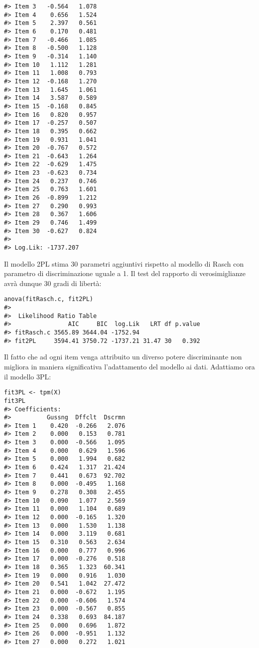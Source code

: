 \begin{exmp}
\begin{lstlisting}
#> Item 3   -0.564   1.078
#> Item 4    0.656   1.524
#> Item 5    2.397   0.561
#> Item 6    0.170   0.481
#> Item 7   -0.466   1.085
#> Item 8   -0.500   1.128
#> Item 9   -0.314   1.140
#> Item 10   1.112   1.281
#> Item 11   1.008   0.793
#> Item 12  -0.168   1.270
#> Item 13   1.645   1.061
#> Item 14   3.587   0.589
#> Item 15  -0.168   0.845
#> Item 16   0.820   0.957
#> Item 17  -0.257   0.507
#> Item 18   0.395   0.662
#> Item 19   0.931   1.041
#> Item 20  -0.767   0.572
#> Item 21  -0.643   1.264
#> Item 22  -0.629   1.475
#> Item 23  -0.623   0.734
#> Item 24   0.237   0.746
#> Item 25   0.763   1.601
#> Item 26  -0.899   1.212
#> Item 27   0.290   0.993
#> Item 28   0.367   1.606
#> Item 29   0.746   1.499
#> Item 30  -0.627   0.824
#> 
#> Log.Lik: -1737.207
\end{lstlisting}
Il modello 2PL stima 30 parametri aggiuntivi rispetto al modello di Rasch con parametro di discriminazione uguale a 1.  Il test del rapporto di verosimiglianze avrà dunque 30 gradi di libertà:
\begin{lstlisting}
anova(fitRasch.c, fit2PL)
#> 
#>  Likelihood Ratio Table
#>                AIC     BIC  log.Lik   LRT df p.value
#> fitRasch.c 3565.89 3644.04 -1752.94                 
#> fit2PL     3594.41 3750.72 -1737.21 31.47 30   0.392
\end{lstlisting}
Il fatto che ad ogni item venga attribuito un diverso potere discriminante non migliora in maniera significativa l'adattamento del modello ai dati. 
Adattiamo ora il modello 3PL:
\begin{lstlisting}
fit3PL <- tpm(X)
fit3PL
#> Coefficients:
#>          Gussng  Dffclt  Dscrmn
#> Item 1    0.420  -0.266   2.076
#> Item 2    0.000   0.153   0.781
#> Item 3    0.000  -0.566   1.095
#> Item 4    0.000   0.629   1.596
#> Item 5    0.000   1.994   0.682
#> Item 6    0.424   1.317  21.424
#> Item 7    0.441   0.673  92.702
#> Item 8    0.000  -0.495   1.168
#> Item 9    0.278   0.308   2.455
#> Item 10   0.090   1.077   2.569
#> Item 11   0.000   1.104   0.689
#> Item 12   0.000  -0.165   1.320
#> Item 13   0.000   1.530   1.138
#> Item 14   0.000   3.119   0.681
#> Item 15   0.310   0.563   2.634
#> Item 16   0.000   0.777   0.996
#> Item 17   0.000  -0.276   0.518
#> Item 18   0.365   1.323  60.341
#> Item 19   0.000   0.916   1.030
#> Item 20   0.541   1.042  27.472
#> Item 21   0.000  -0.672   1.195
#> Item 22   0.000  -0.606   1.574
#> Item 23   0.000  -0.567   0.855
#> Item 24   0.338   0.693  84.187
#> Item 25   0.000   0.696   1.872
#> Item 26   0.000  -0.951   1.132
#> Item 27   0.000   0.272   1.021

\end{lstlisting}
\end{exmp}
